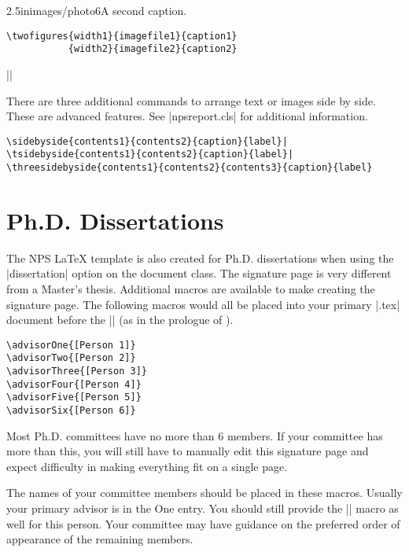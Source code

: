            {2.5in}{images/photo6}{A second caption.}

\begin{Verbatim}
\twofigures{width1}{imagefile1}{caption1}
           {width2}{imagefile2}{caption2}
\end{Verbatim}

||

There are three additional commands to arrange text or images side by side.  These are 
advanced features.  See |npsreport.cls| for additional information.

\begin{Verbatim}
\sidebyside{contents1}{contents2}{caption}{label}|
\tsidebyside{contents1}{contents2}{caption}{label}|
\threesidebyside{contents1}{contents2}{contents3}{caption}{label}
\end{Verbatim}

\section{Ph.D. Dissertations}

The NPS \LaTeX{} template is also created for Ph.D. dissertations when using the |dissertation| option on the document class.  The signature page is very different from a Master's thesis.  Additional macros are available to make creating the signature page.  The following macros would all be placed into your primary |.tex| document before the || (as in the prologue of ).

\begin{Verbatim}
\advisorOne{[Person 1]}
\advisorTwo{[Person 2]}
\advisorThree{[Person 3]}
\advisorFour{[Person 4]}
\advisorFive{[Person 5]}
\advisorSix{[Person 6]}
\end{Verbatim}

Most Ph.D. committees have no more than 6 members.  If your committee has more than this, you will still have to manually edit this signature page and expect difficulty in making everything fit on a single page.

The names of your committee members should be placed in these macros.  Usually your primary advisor is in the One entry. You should still provide the |\thesisadvisor{[ADVISOR]}| macro as well for this person.  Your committee may have guidance on the preferred order of appearance of the remaining members.

